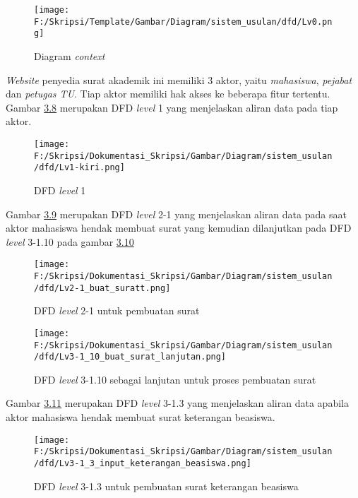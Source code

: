 \begin{figure}[H]
	\centering
		\texttt{[image: F:/Skripsi/Template/Gambar/Diagram/sistem\_usulan/dfd/Lv0.png]}
	\caption{Diagram \textit{context}}
	\label{fig:data_flow}
\end{figure}

\textit{Website} penyedia surat akademik ini memiliki 3 aktor, yaitu \textit{mahasiswa}, \textit{pejabat} dan \textit{petugas TU}. Tiap aktor memiliki hak akses ke beberapa fitur tertentu. Gambar \hyperlink{level_1}{3.8} merupakan DFD \textit{level} 1 yang menjelaskan aliran data pada tiap aktor.

\begin{figure}[H]
	\centering
		\texttt{[image: F:/Skripsi/Dokumentasi\_Skripsi/Gambar/Diagram/sistem\_usulan/dfd/Lv1-kiri.png]}
	\caption{DFD \textit{level} 1}
	\label{fig:level_1}
\end{figure}

Gambar \hyperlink{level_2-1}{3.9} merupakan DFD \textit{level} 2-1 yang menjelaskan aliran data pada saat aktor mahasiswa hendak membuat surat yang kemudian dilanjutkan pada DFD \textit{level} 3-1.10 pada gambar \hyperlink{level_3-1.10}{3.10}

\begin{figure}[H]
	\centering
		\texttt{[image: F:/Skripsi/Dokumentasi\_Skripsi/Gambar/Diagram/sistem\_usulan/dfd/Lv2-1\_buat\_suratt.png]}
	\caption{DFD \textit{level} 2-1 untuk pembuatan surat}
	\label{fig:level_2-1}
\end{figure}

\begin{figure}[H]
	\centering
		\texttt{[image: F:/Skripsi/Dokumentasi\_Skripsi/Gambar/Diagram/sistem\_usulan/dfd/Lv3-1\_10\_buat\_surat\_lanjutan.png]}
	\caption{DFD \textit{level} 3-1.10 sebagai lanjutan untuk proses pembuatan surat}
	\label{fig:level_3-1.10}
\end{figure}

Gambar \hyperlink{level_3-1.3}{3.11} merupakan DFD \textit{level} 3-1.3 yang menjelaskan aliran data apabila aktor mahasiswa hendak membuat surat keterangan beasiswa.
\begin{figure}[H]
	\centering
		\texttt{[image: F:/Skripsi/Dokumentasi\_Skripsi/Gambar/Diagram/sistem\_usulan/dfd/Lv3-1\_3\_input\_keterangan\_beasiswa.png]}
	\caption{DFD \textit{level} 3-1.3 untuk pembuatan surat keterangan beasiswa}
	\label{fig:level_3-1.3}
\end{figure}

